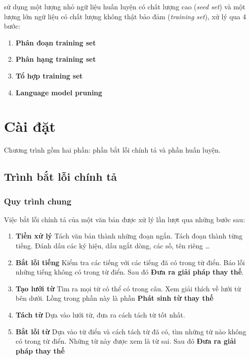 \documentclass[a4paper,oneside]{book} %
\begin{document}
\cite{text-tiling} sử dụng một lượng nhỏ ngữ liệu huấn luyện có chất
lượng cao (\textit{seed set}) và một lượng lớn ngữ liệu có chất lượng
không thật bảo đảm (\textit{training set}), xử lý qua 4 bước:
\begin{enumerate}
\item \textbf{Phân đoạn training set}
\item \textbf{Phân hạng training set}
\item \textbf{Tổ hợp training set}
\item \textbf{Language model pruning}
\end{enumerate}

\chapter{Cài đặt}
\label{cha:implementation}

Chương trình gồm hai phần: phần bắt lỗi chính tả và phần huấn luyện.

\section{Trình bắt lỗi chính tả}


\subsection{Quy trình chung}
\label{sec:spellcheck}

Việc bắt lỗi chính tả của một văn bản được xử lý lần lượt qua những
bước sau:
\begin{enumerate}
\item \textbf{Tiền xử lý} Tách văn bản thành những đoạn ngắn. Tách
  đoạn thành từng tiếng. Đánh dấu các ký hiệu, dấu ngắt dòng, các số,
  tên riêng \ldots
\item \textbf{Bắt lỗi tiếng} Kiểm tra các tiếng với các tiếng đã có
  trong từ điển. Báo lỗi những tiếng không có trong từ điển. Sau đó 
  \textbf{Đưa ra giải pháp thay thế}.
\item \textbf{Tạo lưới từ} Tìm ra mọi từ có thể có trong câu. Xem
  giải thích về lưới từ bên dưới. Lồng trong phần này là phần
  \textbf{Phát sinh từ thay thế}
\item \textbf{Tách từ} Dựa vào lưới từ, đưa ra cách tách từ tốt nhất.
\item \textbf{Bắt lỗi từ} Dựa vào từ điển và cách tách từ đã có,
  tìm những từ nào không có trong từ điển. Những từ này được xem là từ
  sai. Sau đó \textbf{Đưa ra giải pháp thay thế}
\end{enumerate}
\end{document}

